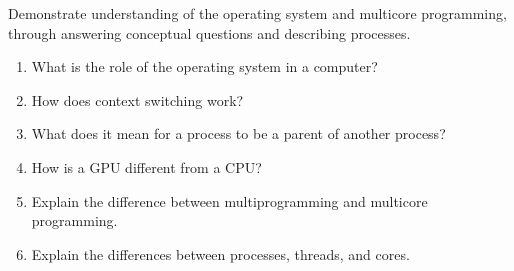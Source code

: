 \documentclass[12pt]{article}
\begin{document}
Demonstrate understanding of the operating system and multicore programming, through answering conceptual questions and describing processes.

\begin{enumerate}
\item What is the role of the operating system in a computer?
\vfill

\item How does context switching work?
\vfill

\item What does it mean for a process to be a parent of another process?
\vfill

\newpage

\item How is a GPU different from a CPU?
\vfill

\item Explain the difference between multiprogramming and multicore programming.
\vfill

\item Explain the differences between processes, threads, and cores.
\vfill

\end{enumerate}

\standardsfooter
\end{document}
